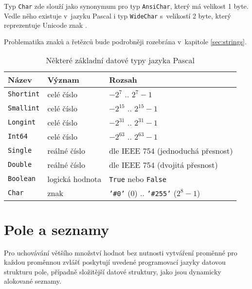 \documentclass[onepage, a4paper, 12pt]{bakalarka}
\begin{document}
Typ \texttt{Char} zde slouží jako synonymum pro typ \texttt{AnsiChar}, který má velikost 1 byte. Vedle něho existuje v~jazyku Pascal i typ \texttt{WideChar} s~velikostí 2 byte, který reprezentuje Unicode znak \cite{pas-guide-types, pas-guide-ansichar, pas-guide-widechar}.\par

Problematika znaků a řetězců bude podrobněji rozebrána v~kapitole \ref{sec:strings}.

\begin{table}\centering
\caption{Některé základní datové typy jazyka Pascal}
\begin{tabular}{| l | l | l |}
\hline
\textbf{Název} & \textbf{Význam} & \textbf{Rozsah} \\ \hline
\texttt{Shortint} & celé číslo & $-2^7$ .. $2^7-1$ \\ \hline
\texttt{Smallint} & celé číslo & $-2^{15}$ .. $2^{15}-1$ \\ \hline
\texttt{Longint} & celé číslo & $-2^{31}$ .. $2^{31}-1$ \\ \hline
\texttt{Int64} & celé číslo & $-2^{63}$ .. $2^{63}-1$ \\ \hline
\texttt{Single} & reálné číslo & dle IEEE 754 (jednoduchá přesnost) \\ \hline
\texttt{Double} & reálné číslo & dle IEEE 754 (dvojitá přesnost) \\ \hline
\texttt{Boolean} & logická hodnota & \texttt{True} nebo \texttt{False} \\ \hline
\texttt{Char} & znak & \texttt{'\#0'} ($0$) .. \texttt{'\#255'} ($2^{8} - 1$) \\ \hline
\end{tabular}
\label{table:pas-types}
\end{table}

\section{Pole a seznamy}
Pro uchovávání většího množství hodnot bez nutnosti vytváření proměnné pro každou proměnnou zvlášť poskytují uvedené programovací jazyky datovou strukturu pole, případně složitější datové struktury, jako jsou dynamicky alokované seznamy.
\end{document}
